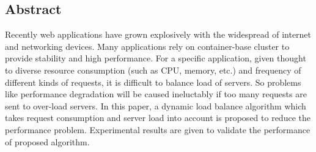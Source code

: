 \subsection*{Abstract}
\hspace{0pt}
Recently web applications have grown explosively with the widespread of internet and networking devices. Many applications rely on container-base cluster to provide stability and high performance. For a specific application, given thought to diverse resource consumption (such as CPU, memory, etc.) and frequency of different kinds of requests, it is difficult to balance load of servers. So problems like performance degradation will be caused ineluctably if too many requests are sent to over-load servers. In this paper, a dynamic load balance algorithm which takes request consumption and server load into account is proposed to reduce the performance problem. Experimental results are given to validate the performance of proposed algorithm.

